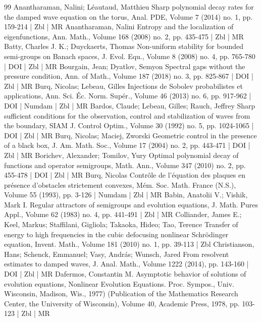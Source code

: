 \documentclass[10pt]{amsart}
\theoremstyle{definition}\newtheorem{defi}[theo]{Definition}\newtheorem{rema}[theo]{Remark}\newtheorem{exam}[theo]{Example}\newtheorem{exem}[theo]{Example}\newtheorem{nota}[theo]{Notation}
\begin{document}
\begin{thebibliography}{99}
Anantharaman, Nalini; Léautaud, Matthieu Sharp polynomial decay rates for the damped wave equation on the torus, Anal. PDE, Volume 7 (2014) no. 1, pp. 159-214 | Zbl | MR
Anantharaman, Nalini Entropy and the localization of eigenfunctions, Ann. Math., Volume 168 (2008) no. 2, pp. 435-475 | Zbl | MR
Batty, Charles J. K.; Duyckaerts, Thomas Non-uniform stability for bounded semi-groups on Banach spaces, J. Evol. Equ., Volume 8 (2008) no. 4, pp. 765-780 | DOI | Zbl | MR
Bourgain, Jean; Dyatlov, Semyon Spectral gaps without the pressure condition, Ann. of Math., Volume 187 (2018) no. 3, pp. 825-867 | DOI | Zbl | MR
Burq, Nicolas; Lebeau, Gilles Injections de Sobolev probabilistes et applications, Ann. Sci. Éc. Norm. Supér., Volume 46 (2013) no. 6, pp. 917-962 | DOI | Numdam | Zbl | MR
Bardos, Claude; Lebeau, Gilles; Rauch, Jeffrey Sharp sufficient conditions for the observation, control and stabilization of waves from the boundary, SIAM J. Control Optim., Volume 30 (1992) no. 5, pp. 1024-1065 | DOI | Zbl | MR
Burq, Nicolas; Maciej, Zworski Geometric control in the presence of a black box, J. Am. Math. Soc., Volume 17 (2004) no. 2, pp. 443-471 | DOI | Zbl | MR
Borichev, Alexander; Tomilov, Yury Optimal polynomial decay of functions and operator semigroups, Math. Ann., Volume 347 (2010) no. 2, pp. 455-478 | DOI | Zbl | MR
Burq, Nicolas Contrôle de l’équation des plaques en présence d’obstacles strictement convexes, Mém. Soc. Math. France (N.S.), Volume 55 (1993), pp. 3-126 | Numdam | Zbl | MR
Babin, Anatolii V.; Vishik, Mark I. Regular attractors of semigroups and evolution equations, J. Math. Pures Appl., Volume 62 (1983) no. 4, pp. 441-491 | Zbl | MR
Colliander, James E.; Keel, Markus; Staffilani, Gigliola; Takaoka, Hideo; Tao, Terence Transfer of energy to high frequencies in the cubic defocusing nonlinear Schrödinger equation, Invent. Math., Volume 181 (2010) no. 1, pp. 39-113 | Zbl
Christianson, Hans; Schenck, Emmanuel; Vasy, András; Wunsch, Jared From resolvent estimates to damped waves, J. Anal. Math., Volume 1222 (2014), pp. 143-160 | DOI | Zbl | MR
Dafermos, Constantin M. Asymptotic behavior of solutions of evolution equations, Nonlinear Evolution Equations. Proc. Sympos., Univ. Wisconsin, Madison, Wis., 1977) (Publication of the Mathematics Research Center, the University of Wisconsin), Volume 40, Academic Press, 1978, pp. 103-123 | Zbl | MR

\end{thebibliography}
\end{document}
